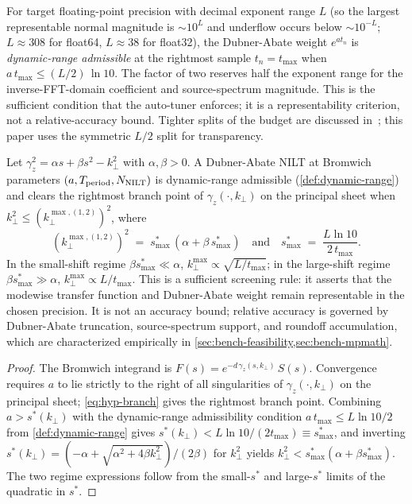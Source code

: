\documentclass[manuscript,review]{acmart}
\newcommand{\kperp}{k_\perp}
\newcommand{\kpmax}[1][]{k_\perp^{\max#1}}
\newcommand{\gammaz}{\gamma_z}
\begin{document}
\begin{definition}\label{def:dynamic-range}
For target floating-point precision with decimal exponent range
$L$ (so the largest representable normal magnitude is $\sim 10^{L}$
and underflow occurs below $\sim 10^{-L}$; $L \approx 308$ for
float64, $L \approx 38$ for float32), the Dubner-Abate weight
$e^{a t_n}$ is \emph{dynamic-range admissible} at the rightmost
sample $t_n = t_{\max}$ when
$a\, t_{\max} \le (L/2)\,\ln 10$.
The factor of two reserves half the exponent range for the
inverse-FFT-domain coefficient and source-spectrum magnitude.
This is the sufficient condition that the auto-tuner enforces; it
is a representability criterion, not a relative-accuracy bound.
Tighter splits of the budget are discussed
in~\cite{pavlov2026ces}; this paper uses the symmetric $L/2$ split
for transparency.
\end{definition}

\begin{proposition}\label{thm:hyp-bound}
Let $\gammaz^2 = \alpha s + \beta s^2 - \kperp^2$ with $\alpha,
\beta > 0$. A Dubner-Abate NILT at Bromwich parameters $(a,
T_{\rm period}, N_{\mathrm{NILT}})$ is dynamic-range admissible
(\cref{def:dynamic-range}) and clears the rightmost branch point
of $\gammaz(\cdot, \kperp)$ on the principal sheet when
$\kperp^2 \le (\kpmax[,(1,2)])^2$, where
\begin{equation}
(\kpmax[,(1,2)])^2 \;=\; s^*_{\max}\,(\alpha + \beta\,s^*_{\max})
\quad\text{and}\quad
s^*_{\max} \;=\; \frac{L \ln 10}{2\,t_{\max}}.
\label{eq:hyp-cutoff}
\end{equation}
In the small-shift regime $\beta s^*_{\max} \ll \alpha$,
$\kpmax \propto \sqrt{L/t_{\max}}$; in the large-shift regime
$\beta s^*_{\max} \gg \alpha$, $\kpmax \propto L/t_{\max}$.
This is a sufficient screening rule: it asserts that the modewise
transfer function and Dubner-Abate weight remain representable in
the chosen precision. It is not an accuracy bound; relative
accuracy is governed by Dubner-Abate truncation, source-spectrum
support, and roundoff accumulation, which are characterized
empirically in \cref{sec:bench-feasibility,sec:bench-mpmath}.
\end{proposition}

\begin{proof}[Proof]
The Bromwich integrand is $F(s) = e^{-d\,\gammaz(s, \kperp)}\,S(s)$.
Convergence requires $a$ to lie strictly to the right of all
singularities of $\gammaz(\cdot, \kperp)$ on the principal sheet;
\cref{eq:hyp-branch} gives the rightmost branch point. Combining
$a > s^*(\kperp)$ with the dynamic-range admissibility condition
$a\,t_{\max} \le L\ln 10/2$ from \cref{def:dynamic-range} gives
$s^*(\kperp) < L\ln 10/(2 t_{\max}) \equiv s^*_{\max}$, and
inverting $s^*(\kperp) = (-\alpha + \sqrt{\alpha^2 + 4\beta\kperp^2})/(2\beta)$
for $\kperp^2$ yields $\kperp^2 < s^*_{\max}(\alpha + \beta
s^*_{\max})$. The two regime expressions follow from the
small-$s^*$ and large-$s^*$ limits of the quadratic in $s^*$.
\end{proof}
\end{document}
